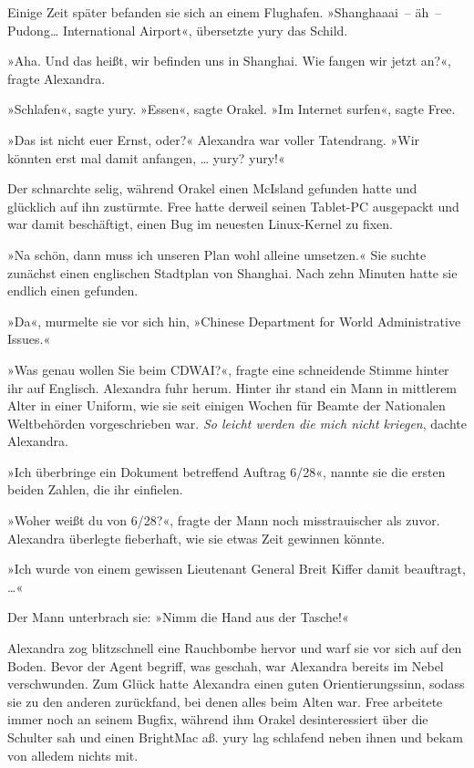 Einige Zeit später befanden sie sich an einem Flughafen. »Shanghaaai~– äh~– Pudong… International Airport«, übersetzte yury das Schild.

»Aha. Und das heißt, wir befinden uns in Shanghai. Wie fangen wir jetzt an?«, fragte Alexandra.

»Schlafen«, sagte yury. »Essen«, sagte Orakel. »Im Internet surfen«, sagte Free.

»Das ist nicht euer Ernst, oder?« Alexandra war voller Tatendrang. »Wir könnten erst mal damit anfangen, … yury? yury!«

Der schnarchte selig, während Orakel einen McIsland gefunden hatte und glücklich auf ihn zustürmte. Free hatte derweil seinen Tablet-PC ausgepackt und war damit beschäftigt, einen Bug im neuesten Linux-Kernel zu fixen.

»Na schön, dann muss ich unseren Plan wohl alleine umsetzen.« Sie suchte zunächst einen englischen Stadtplan von Shanghai. Nach zehn Minuten hatte sie endlich einen gefunden.

»Da«, murmelte sie vor sich hin, »Chinese Department for World Administrative Issues.«

»Was genau wollen Sie beim CDWAI?«, fragte eine schneidende Stimme hinter ihr auf Englisch. Alexandra fuhr herum. Hinter ihr stand ein Mann in mittlerem Alter in einer Uniform, wie sie seit einigen Wochen für Beamte der Nationalen Weltbehörden vorgeschrieben war. \textit{So leicht werden die mich nicht kriegen}, dachte Alexandra.

»Ich überbringe ein Dokument betreffend Auftrag 6/28«, nannte sie die ersten beiden Zahlen, die ihr einfielen.

»Woher weißt du von 6/28?«, fragte der Mann noch misstrauischer als zuvor. Alexandra überlegte fieberhaft, wie sie etwas Zeit gewinnen könnte.

»Ich wurde von einem gewissen Lieutenant General Breit Kiffer damit beauftragt, …«

Der Mann unterbrach sie: »Nimm die Hand aus der Tasche!«

Alexandra zog blitzschnell eine Rauchbombe hervor und warf sie vor sich auf den Boden. Bevor der Agent begriff, was geschah, war Alexandra bereits im Nebel verschwunden. Zum Glück hatte Alexandra einen guten Orientierungssinn, sodass sie zu den anderen zurückfand, bei denen alles beim Alten war. Free arbeitete immer noch an seinem Bugfix, während ihm Orakel desinteressiert über die Schulter sah und einen BrightMac aß. yury lag schlafend neben ihnen und bekam von alledem nichts mit.

